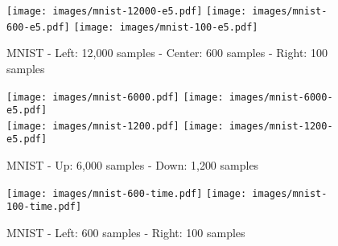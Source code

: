 \documentclass{article}
\begin{document}
\begin{figure}[ht!]
\texttt{[image: images/mnist-12000-e5.pdf]} \hfill 
\texttt{[image: images/mnist-600-e5.pdf]} \hfill
\texttt{[image: images/mnist-100-e5.pdf]}
\caption{MNIST - Left: 12,000 samples - Center: 600 samples - Right: 100 samples}
\label{sup-reg-im-MNIST-e5}
\end{figure}


\begin{figure}[ht!]
\texttt{[image: images/mnist-6000.pdf]} \hfill 
\texttt{[image: images/mnist-6000-e5.pdf]} \\
\texttt{[image: images/mnist-1200.pdf]} \hfill
\texttt{[image: images/mnist-1200-e5.pdf]}
\caption{MNIST - Up: 6,000 samples - Down: 1,200 samples}
\label{sup-reg-im-MNIST}
\end{figure}

\begin{figure}[ht!]
\texttt{[image: images/mnist-600-time.pdf]} \hfill
\texttt{[image: images/mnist-100-time.pdf]}
\caption{MNIST - Left: 600 samples - Right: 100 samples}
\label{t-vs-err-im-MNIST}
\end{figure}



%
%
\end{document}
